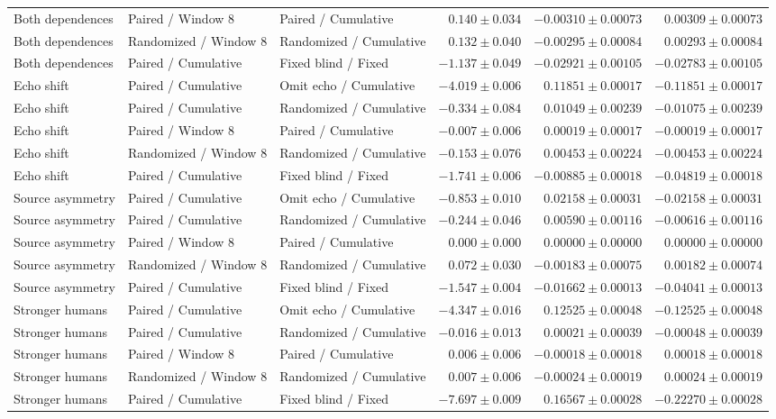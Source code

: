\begin{longtable}{@{}l>{\raggedright\arraybackslash}p{.175\linewidth}>{\raggedright\arraybackslash}p{.175\linewidth}rrr@{}}
Both dependences & Paired / Window 8 & Paired / Cumulative & $0.140 \pm 0.034$ & $-0.00310 \pm 0.00073$ & $0.00309 \pm 0.00073$ \\
Both dependences & Randomized / Window 8 & Randomized / Cumulative & $0.132 \pm 0.040$ & $-0.00295 \pm 0.00084$ & $0.00293 \pm 0.00084$ \\
Both dependences & Paired / Cumulative & Fixed blind / Fixed & $-1.137 \pm 0.049$ & $-0.02921 \pm 0.00105$ & $-0.02783 \pm 0.00105$ \\
Echo shift & Paired / Cumulative & Omit echo / Cumulative & $-4.019 \pm 0.006$ & $0.11851 \pm 0.00017$ & $-0.11851 \pm 0.00017$ \\
Echo shift & Paired / Cumulative & Randomized / Cumulative & $-0.334 \pm 0.084$ & $0.01049 \pm 0.00239$ & $-0.01075 \pm 0.00239$ \\
Echo shift & Paired / Window 8 & Paired / Cumulative & $-0.007 \pm 0.006$ & $0.00019 \pm 0.00017$ & $-0.00019 \pm 0.00017$ \\
Echo shift & Randomized / Window 8 & Randomized / Cumulative & $-0.153 \pm 0.076$ & $0.00453 \pm 0.00224$ & $-0.00453 \pm 0.00224$ \\
Echo shift & Paired / Cumulative & Fixed blind / Fixed & $-1.741 \pm 0.006$ & $-0.00885 \pm 0.00018$ & $-0.04819 \pm 0.00018$ \\
Source asymmetry & Paired / Cumulative & Omit echo / Cumulative & $-0.853 \pm 0.010$ & $0.02158 \pm 0.00031$ & $-0.02158 \pm 0.00031$ \\
Source asymmetry & Paired / Cumulative & Randomized / Cumulative & $-0.244 \pm 0.046$ & $0.00590 \pm 0.00116$ & $-0.00616 \pm 0.00116$ \\
Source asymmetry & Paired / Window 8 & Paired / Cumulative & $0.000 \pm 0.000$ & $0.00000 \pm 0.00000$ & $0.00000 \pm 0.00000$ \\
Source asymmetry & Randomized / Window 8 & Randomized / Cumulative & $0.072 \pm 0.030$ & $-0.00183 \pm 0.00075$ & $0.00182 \pm 0.00074$ \\
Source asymmetry & Paired / Cumulative & Fixed blind / Fixed & $-1.547 \pm 0.004$ & $-0.01662 \pm 0.00013$ & $-0.04041 \pm 0.00013$ \\
Stronger humans & Paired / Cumulative & Omit echo / Cumulative & $-4.347 \pm 0.016$ & $0.12525 \pm 0.00048$ & $-0.12525 \pm 0.00048$ \\
Stronger humans & Paired / Cumulative & Randomized / Cumulative & $-0.016 \pm 0.013$ & $0.00021 \pm 0.00039$ & $-0.00048 \pm 0.00039$ \\
Stronger humans & Paired / Window 8 & Paired / Cumulative & $0.006 \pm 0.006$ & $-0.00018 \pm 0.00018$ & $0.00018 \pm 0.00018$ \\
Stronger humans & Randomized / Window 8 & Randomized / Cumulative & $0.007 \pm 0.006$ & $-0.00024 \pm 0.00019$ & $0.00024 \pm 0.00019$ \\
Stronger humans & Paired / Cumulative & Fixed blind / Fixed & $-7.697 \pm 0.009$ & $0.16567 \pm 0.00028$ & $-0.22270 \pm 0.00028$ \\
\end{longtable}\endgroup
\endgroup
